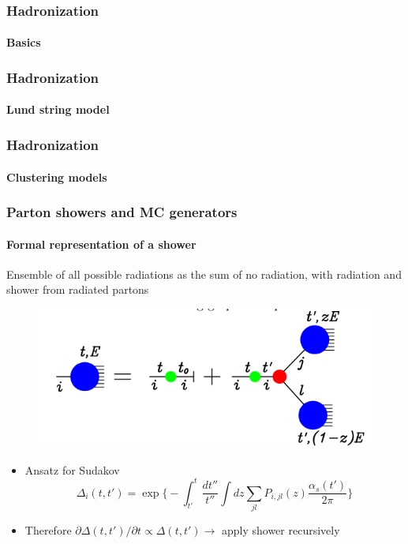\documentclass[aspectratio=43]{beamer}
\begin{document}
\begin{frame}
	
	\frametitle{Hadronization}
	\framesubtitle{Basics}

\end{frame}

\begin{frame}
	
	\frametitle{Hadronization}
	\framesubtitle{Lund string model}

\end{frame}

\begin{frame}
	
	\frametitle{Hadronization}
	\framesubtitle{Clustering models}

\end{frame}









\begin{frame}

	\frametitle{Parton showers and MC generators}
	\framesubtitle{Formal representation of a shower}
	 
	 
	 Ensemble of all possible radiations as the sum of no radiation, with radiation and shower from radiated partons
	\begin{figure}
		\includegraphics[width = 7 cm]{plots/shower_2.png}
	\end{figure}
	
	\begin{itemize} 
		\item Ansatz for Sudakov $$\Delta_{i}(t, t') = \exp\Bigg\{- \int_{t'}^{t} \frac{dt''}{t''}\int dz \sum_{jl} P_{i, jl}(z) \frac{\alpha_{s}(t')}{2\pi} \Bigg\}$$
		\item Therefore $\partial \Delta(t, t') / \partial t \propto \Delta(t, t') \longrightarrow$ apply shower recursively
	\end{itemize}

\end{frame}
\end{document}
